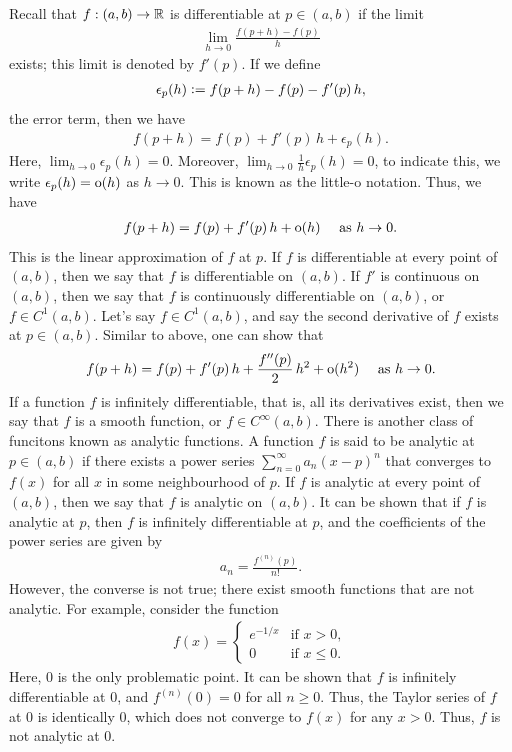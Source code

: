Recall that $f:(a,b) \to \mathbb{R}$ is differentiable at $p \in (a,b)$ if the limit
\begin{align}
    \lim_{h \to 0} \frac{f(p+h) - f(p)}{h}
\end{align}
exists; this limit is denoted by $f'(p)$. If we define
\begin{align}
    \epsilon_{p}(h) \vcentcolon= f(p+h) - f(p) - f'(p) \, h,
\end{align}
the error term, then we have
\begin{align}
    f(p+h) = f(p) + f'(p) \, h + \epsilon_{p}(h).
\end{align}
Here, $\lim_{h \to 0} \epsilon_{p}(h) = 0$. Moreover, $\lim_{h \to 0} \frac{1}{h} \epsilon_{p}(h) = 0$, to indicate this, we write $\epsilon_{p}(h) = \operatorname{o}(h)$ as $h \to 0$. This is known as the little-o notation. Thus, we have
\begin{align}
    f(p+h) = f(p) + f'(p) \, h + \operatorname{o}(h) \quad \text{ as } h \to 0.
\end{align}
This is the linear approximation of $f$ at $p$. If $f$ is differentiable at every point of $(a,b)$, then we say that $f$ is differentiable on $(a,b)$. If $f'$ is continuous on $(a,b)$, then we say that $f$ is continuously differentiable on $(a,b)$, or $f \in C^{1}(a,b)$. Let's say $f \in C^{1}(a,b)$, and say the second derivative of $f$ exists at $p \in (a,b)$. Similar to above, one can show that
\begin{align}
    f(p+h) = f(p) + f'(p) \, h + \frac{f''(p)}{2} \, h^{2} + \operatorname{o}(h^{2}) \quad \text{ as } h \to 0.
\end{align}
If a function $f$ is infinitely differentiable, that is, all its derivatives exist, then we say that $f$ is a smooth function, or $f \in C^{\infty}(a,b)$. There is another class of funcitons known as analytic functions. A function $f$ is said to be analytic at $p \in (a,b)$ if there exists a power series $\sum_{n=0}^{\infty} a_{n} (x - p)^{n}$ that converges to $f(x)$ for all $x$ in some neighbourhood of $p$. If $f$ is analytic at every point of $(a,b)$, then we say that $f$ is analytic on $(a,b)$. It can be shown that if $f$ is analytic at $p$, then $f$ is infinitely differentiable at $p$, and the coefficients of the power series are given by
\begin{align}
    a_{n} = \frac{f^{(n)}(p)}{n!}.
\end{align}
However, the converse is not true; there exist smooth functions that are not analytic. For example, consider the function
\begin{align}
    f(x) = \begin{cases}
        e^{-1/x} &\text{if } x > 0, \\
        0 & \text{if } x \leq 0.
    \end{cases}
\end{align}
Here, 0 is the only problematic point. It can be shown that $f$ is infinitely differentiable at $0$, and $f^{(n)}(0) = 0$ for all $n \geq 0$. Thus, the Taylor series of $f$ at $0$ is identically $0$, which does not converge to $f(x)$ for any $x > 0$. Thus, $f$ is not analytic at $0$.

